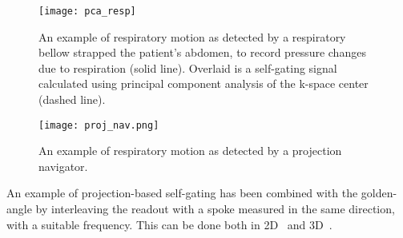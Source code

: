\begin{figure}
    \centering
    \texttt{[image: pca\_resp]}
    \caption{An example of respiratory motion as detected by a respiratory bellow strapped the patient's abdomen, to record pressure changes due to respiration (solid line). Overlaid is a self-gating signal calculated using principal component analysis of the k-space center (dashed line). }
    \label{fig:pca_resp}
\end{figure}

\begin{figure}
    \centering
    \texttt{[image: proj\_nav.png]}
    \caption{An example of respiratory motion as detected by a projection navigator. }
    \label{fig:proj_resp}
\end{figure}

An example of projection-based self-gating has been combined with the golden-angle by interleaving the readout with a spoke measured in the same direction, with a suitable frequency. This can be done both in 2D~\cite{Kramer2014} and 3D~\cite{Pang2014}.


